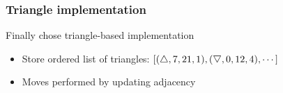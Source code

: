 \begin{frame}
    \frametitle{Triangle implementation}

    Finally chose triangle-based implementation
    \begin{itemize}
        \item Store ordered list of triangles: $[(\tup, 7, 21, 1), (\tdown, 0, 12, 4), \cdots]$
        \item Moves performed by updating adjacency
    \end{itemize}

    \begin{figure}[b]
        \centering
        \def\svgwidth{0.5\linewidth}
        
    \end{figure}
\end{frame}



